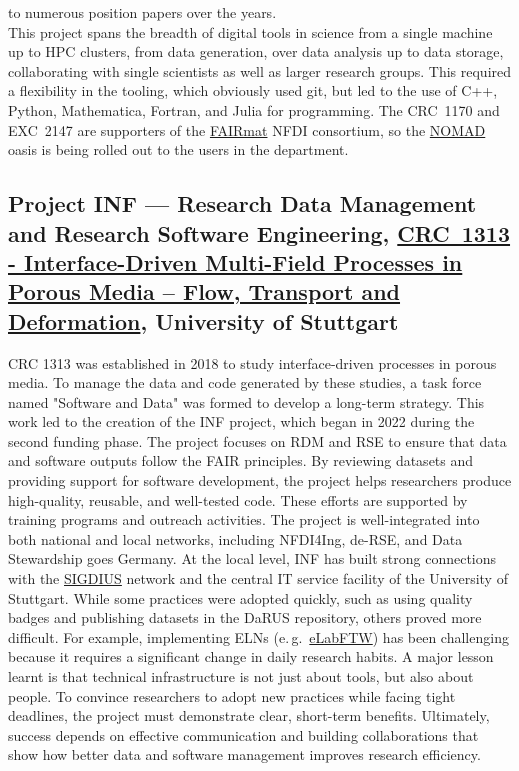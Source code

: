 \documentclass{eceasst}
\newcommand{\eg}{e.\,g.}
\begin{document}
to numerous position papers\cite{Anzt:2020,Goth:2025,gi2025,Kempf2026} over the years.\\
This project spans the breadth of digital tools in science from a single machine up to HPC clusters, from data generation, over data analysis up to data storage, collaborating with single scientists as well as larger research groups.
This required a flexibility in the tooling, which obviously used git, but led to the use of C++, Python, Mathematica, Fortran, and Julia for programming.
The CRC~1170 and EXC~2147 are supporters of the \href{https://www.fairmat-nfdi.eu/fairmat/}{FAIRmat} NFDI consortium, so the \href{https://nomad-lab.eu/nomad-lab/nomad.html}{NOMAD} oasis is being rolled out to
the users in the department.

\subsection{Project INF --- Research Data Management and Research Software Engineering, \href{https://gepris.dfg.de/gepris/projekt/327154368}{CRC~1313 - Interface-Driven Multi-Field Processes in Porous Media – Flow, Transport and Deformation}, University of Stuttgart}
CRC 1313 was established in 2018 to study interface-driven processes in porous media.
To manage the data and code generated by these studies, a task force named "Software and Data" was formed to develop a long-term strategy.
This work led to the creation of the INF project, which began in 2022 during the second funding phase.
The project focuses on RDM and RSE to ensure that data and software outputs follow the FAIR principles.
By reviewing datasets and providing support for software development, the project helps researchers produce high-quality, reusable, and well-tested code.
These efforts are supported by training programs and outreach activities.
The project is well-integrated into both national and local networks, including NFDI4Ing, de-RSE, and Data Stewardship goes Germany.
At the local level, INF has built strong connections with the \href{https://www.simtech.uni-stuttgart.de/communication/events/workshops/sigdius-seminars/}{SIGDIUS} network and the central IT service facility of the University of Stuttgart. While some practices were adopted quickly, such as using quality badges and publishing datasets in the DaRUS repository, others proved more difficult.
For example, implementing ELNs (\eg~\href{https://www.elabftw.net/}{eLabFTW}) has been challenging because it requires a significant change in daily research habits.
A major lesson learnt is that technical infrastructure is not just about tools, but also about people. To convince researchers to adopt new practices while facing tight deadlines, the project must demonstrate clear, short-term benefits.
Ultimately, success depends on effective communication and building collaborations that show how better data and software management improves research efficiency.
\end{document}
